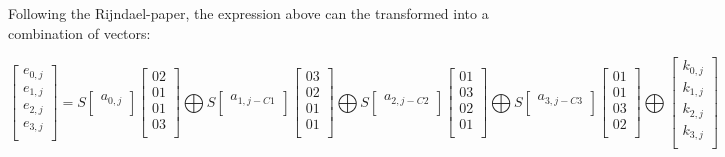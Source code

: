 \documentclass{article}
\begin{document}
Following the Rijndael-paper, the expression above can the transformed into a combination of vectors:

\[
\begin{bmatrix}
e_{0,j} \\
e_{1,j} \\
e_{2,j} \\
e_{3,j} \\
\end{bmatrix}
=
S
\begin{bmatrix}
a_{0,j} \\
\end{bmatrix}
\begin{bmatrix}
02 \\
01 \\
01 \\
03 \\
\end{bmatrix}
\bigoplus
S
\begin{bmatrix}
a_{1,j-C1} \\
\end{bmatrix}
\begin{bmatrix}
03 \\
02 \\
01 \\
01 \\
\end{bmatrix}
\bigoplus
S
\begin{bmatrix}
a_{2,j-C2} \\
\end{bmatrix}
\begin{bmatrix}
01 \\
03 \\
02 \\
01 \\
\end{bmatrix}
\bigoplus
S
\begin{bmatrix}
a_{3,j-C3} \\
\end{bmatrix}
\begin{bmatrix}
01 \\
01 \\
03 \\
02 \\
\end{bmatrix}
\bigoplus
\begin{bmatrix}
k_{0,j} \\
k_{1,j} \\
k_{2,j} \\
k_{3,j} \\
\end{bmatrix}
\]
\end{document}
